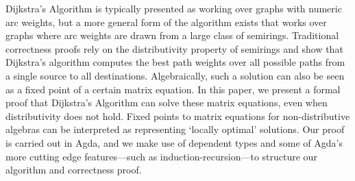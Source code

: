 Dijkstra's Algorithm is typically presented as working over graphs with numeric arc weights, but a more general form of the algorithm exists that works over graphs where arc weights are drawn from a large class of semirings.
Traditional correctness proofs rely on the distributivity property of semirings and show that Dijkstra's algorithm computes the best path weights over all possible paths from a single source to all destinations.
Algebraically, such a solution can also be seen as a fixed point of a certain matrix equation.
In this paper, we present a formal proof that Dijkstra's Algorithm can solve these matrix equations, even when distributivity does not hold.
Fixed points to matrix equations for non-distributive algebras can be interpreted as representing `locally optimal' solutions.
Our proof is carried out in Agda, and we make use of dependent types and some of Agda's more cutting edge features---such as induction-recursion---to structure our algorithm and correctness proof.

